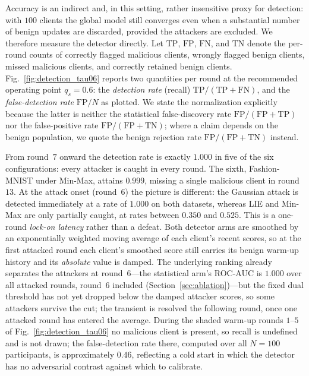 \documentclass[journal]{IEEEtran}
\begin{document}
Accuracy is an indirect and, in this setting, rather insensitive proxy for detection: with $100$ clients the global model still converges even when a substantial number of benign updates are discarded, provided the attackers are excluded. We therefore measure the detector directly. Let $\mathrm{TP}$, $\mathrm{FP}$, $\mathrm{FN}$, and $\mathrm{TN}$ denote the per-round counts of correctly flagged malicious clients, wrongly flagged benign clients, missed malicious clients, and correctly retained benign clients. Fig.~\ref{fig:detection_tau06} reports two quantities per round at the recommended operating point $q_s = 0.6$: the \emph{detection rate} (recall) $\mathrm{TP}/(\mathrm{TP}+\mathrm{FN})$, and the \emph{false-detection rate} $\mathrm{FP}/N$ as plotted. We state the normalization explicitly because the latter is neither the statistical false-discovery rate $\mathrm{FP}/(\mathrm{FP}+\mathrm{TP})$ nor the false-positive rate $\mathrm{FP}/(\mathrm{FP}+\mathrm{TN})$; where a claim depends on the benign population, we quote the benign rejection rate $\mathrm{FP}/(\mathrm{FP}+\mathrm{TN})$ instead.

From round~$7$ onward the detection rate is exactly $1.000$ in five of the six configurations: every attacker is caught in every round. The sixth, Fashion-MNIST under Min-Max, attains $0.999$, missing a single malicious client in round~$13$. At the attack onset (round~$6$) the picture is different: the Gaussian attack is detected immediately at a rate of $1.000$ on both datasets, whereas LIE and Min-Max are only partially caught, at rates between $0.350$ and $0.525$. This is a one-round \emph{lock-on latency} rather than a defeat. Both detector arms are smoothed by an exponentially weighted moving average of each client's recent scores, so at the first attacked round each client's smoothed score still carries its benign warm-up history and its \emph{absolute} value is damped. The underlying ranking already separates the attackers at round~$6$---the statistical arm's ROC-AUC is $1.000$ over all attacked rounds, round~$6$ included (Section~\ref{sec:ablation})---but the fixed dual threshold has not yet dropped below the damped attacker scores, so some attackers survive the cut; the transient is resolved the following round, once one attacked round has entered the average. During the shaded warm-up rounds $1$--$5$ of Fig.~\ref{fig:detection_tau06} no malicious client is present, so recall is undefined and is not drawn; the false-detection rate there, computed over all $N = 100$ participants, is approximately $0.46$, reflecting a cold start in which the detector has no adversarial contrast against which to calibrate.
\end{document}
